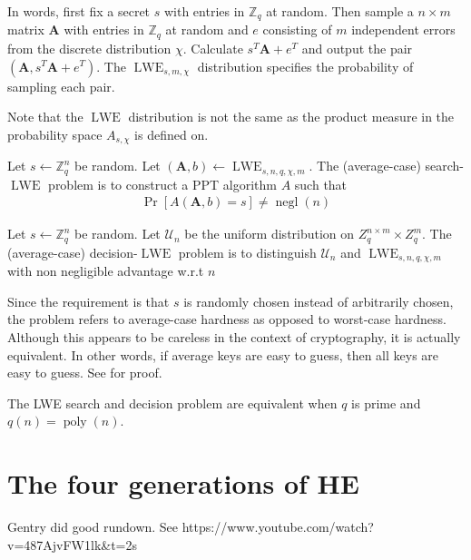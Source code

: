 In words, first fix a secret $s$ with entries in $\mathbb{Z}_q$ at random. Then sample a $n \times m$ matrix $\textbf{A}$ with entries in $\mathbb{Z}_q$ at random and $e$ consisting of $m$ independent errors from the discrete distribution $\chi$. Calculate $s^T\textbf{A}+e^T$ and output the pair $(\textbf{A},s^T\textbf{A}+e^T)$. The $\operatorname{LWE}_{s, m, \chi}$ distribution specifies the probability of sampling each pair.

Note that the $\operatorname{LWE}$ distribution is not the same as the product measure in the probability space $A_{s,\chi}$ is defined on.

\begin{definition}
    Let $s \leftarrow \mathbb{Z}_q^n$ be random.
    Let $(\textbf{A}, b) \leftarrow \operatorname{LWE}_{s, n, q, \chi, m}$. The (average-case) search-$\operatorname{LWE}$ problem is to construct a PPT algorithm $A$ such that
    \begin{equation}
        \begin{aligned}
            \operatorname{Pr}[A(\textbf{A}, b) = s] \neq \operatorname{negl}(n)
        \end{aligned}
    \end{equation}
\end{definition}

\begin{definition}
    Let $s \leftarrow \mathbb{Z}_q^n$ be random.
    Let $\mathcal{U}_n$ be the uniform distribution on $Z_q^{n \times m} \times Z_q^m$. The (average-case) decision-$\operatorname{LWE}$ problem is to distinguish $\mathcal{U}_n$ and $\operatorname{LWE}_{s, n, q, \chi, m}$ with non negligible advantage w.r.t $n$
\end{definition}
\begin{remark}
    Since the requirement is that $s$ is randomly chosen instead of arbitrarily chosen, the problem refers to average-case hardness as opposed to worst-case hardness. Although this appears to be careless in the context of cryptography, it is actually equivalent. In other words, if average keys are easy to guess, then all keys are easy to guess. See \cite{Reg10} for proof.
\end{remark}

The LWE search and decision problem are equivalent when $q$ is prime and $q(n) = \operatorname{poly}(n)$.



\section{The four generations of HE}
Gentry did good rundown. See https://www.youtube.com/watch?v=487AjvFW1lk&t=2s 

